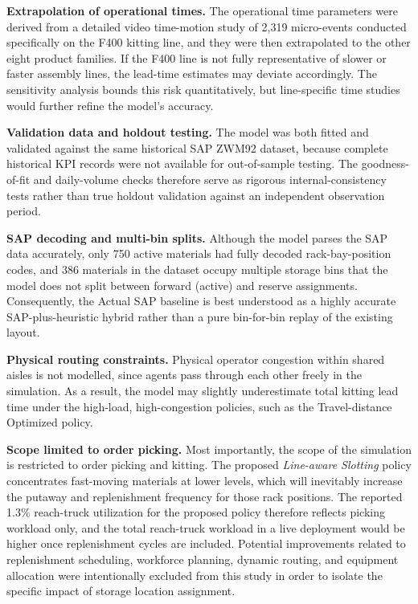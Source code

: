 \documentclass[12pt,a4paper]{article}
\newcommand{\policy}[1]{\textit{#1}}
\begin{document}
\textbf{Extrapolation of operational times.} The operational time parameters
were derived from a detailed video time-motion study of 2{,}319 micro-events
conducted specifically on the F400 kitting line, and they were then
extrapolated to the other eight product families. If the F400 line is not
fully representative of slower or faster assembly lines, the lead-time
estimates may deviate accordingly. The sensitivity analysis bounds this risk
quantitatively, but line-specific time studies would further refine the
model's accuracy.

\textbf{Validation data and holdout testing.} The model was both fitted and
validated against the same historical SAP ZWM92 dataset, because complete
historical KPI records were not available for out-of-sample testing. The
goodness-of-fit and daily-volume checks therefore serve as rigorous
internal-consistency tests rather than true holdout validation against an
independent observation period.

\textbf{SAP decoding and multi-bin splits.} Although the model parses the SAP
data accurately, only 750 active materials had fully decoded
rack-bay-position codes, and 386 materials in the dataset occupy multiple
storage bins that the model does not split between forward (active) and
reserve assignments. Consequently, the Actual SAP baseline is best understood
as a highly accurate SAP-plus-heuristic hybrid rather than a pure bin-for-bin
replay of the existing layout.

\textbf{Physical routing constraints.} Physical operator congestion within
shared aisles is not modelled, since agents pass through each other freely in
the simulation. As a result, the model may slightly underestimate total
kitting lead time under the high-load, high-congestion policies, such as the
Travel-distance Optimized policy.

\textbf{Scope limited to order picking.} Most importantly, the scope of the
simulation is restricted to order picking and kitting. The proposed
\policy{Line-aware Slotting} policy concentrates fast-moving materials at lower
levels, which will inevitably increase the putaway and replenishment frequency
for those rack positions. The reported 1.3\% reach-truck utilization for the
proposed policy therefore reflects picking workload only, and the total
reach-truck workload in a live deployment would be higher once replenishment
cycles are included. Potential improvements related to replenishment
scheduling, workforce planning, dynamic routing, and equipment allocation were
intentionally excluded from this study in order to isolate the specific impact
of storage location assignment.
\end{document}
